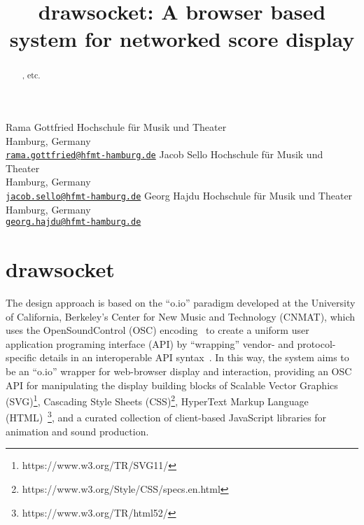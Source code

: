 

\def\papertitle{drawsocket: A browser based system for networked score display%
}
\def\firstauthor{Rama Gottfried}
\def\secondauthor{Jacob Sello}
\def\thirdauthor{Georg Hajdu}

\title{\papertitle}
 \threeauthors
   {\firstauthor} {
   Hochschule f\"ur Musik und Theater\\
   Hamburg, Germany \\ %
   \small{\tt \href{mailto:rama.gottfried@hfmt-hamburg.de}{rama.gottfried@hfmt-hamburg.de}}}
    {\secondauthor} {
   Hochschule f\"ur Musik und Theater\\
   Hamburg, Germany \\ %
   \small{\tt \href{mailto:jacob.sello@hfmt-hamburg.de}{jacob.sello@hfmt-hamburg.de}}}
   {\thirdauthor} {
   Hochschule f\"ur Musik und Theater\\
   Hamburg, Germany \\ %
   \small{\tt \href{mailto:georg.hajdu@hfmt-hamburg.de}{georg.hajdu@hfmt-hamburg.de}}}





%

\capstartfalse
\maketitle
\capstarttrue
%
\begin{abstract}
 \drawsocket, \maxscore etc.

\end{abstract}





\section{drawsocket}\label{sec:drawsocket}
The \drawsocket design approach is based on the ``o.io'' paradigm developed at the University of California, Berkeley's Center for New Music and Technology (CNMAT), which uses the OpenSoundControl (OSC) encoding~\cite{wright:osc} to create a uniform user application programing interface (API) by ``wrapping'' vendor- and protocol- specific details in an interoperable API syntax~\cite{freed2014io, maccallum2015dynamic}.
In this way, the \drawsocket system aims to be an ``o.io'' wrapper for web-browser display and interaction, providing an OSC API for manipulating the display building blocks of Scalable Vector Graphics (SVG)\footnote{https://www.w3.org/TR/SVG11/}, Cascading Style Sheets (CSS)\footnote{https://www.w3.org/Style/CSS/specs.en.html}, HyperText Markup Language (HTML)~\footnote{https://www.w3.org/TR/html52/}, and a curated collection of client-based JavaScript libraries for animation and sound production.

